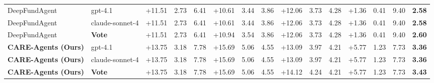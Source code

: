 \begin{table}[t]
{\begin{tabular}{llrrrrrrrrrrrrr}
DeepFundAgent & gpt-4.1 & +11.51 & 2.73 & 6.41 & +10.61 & 3.44 & 3.86 & +12.06 & 3.73 & 4.28 & +1.36 & 0.41 & 9.40 & \textbf{2.58} \\
DeepFundAgent & claude-sonnet-4 & +11.51 & 2.73 & 6.41 & +10.61 & 3.44 & 3.86 & +12.06 & 3.73 & 4.28 & +1.36 & 0.41 & 9.40 & \textbf{2.58} \\
DeepFundAgent & \textbf{Vote} & +11.51 & 2.73 & 6.41 & +10.94 & 3.54 & 3.86 & +12.06 & 3.73 & 4.28 & +1.36 & 0.41 & 9.40 & \textbf{2.60} \\
\textbf{CARE-Agents (Ours)} & gpt-4.1 & +13.75 & 3.18 & 7.78 & +15.69 & 5.06 & 4.55 & +13.09 & 3.97 & 4.21 & +5.77 & 1.23 & 7.73 & \textbf{3.36} \\
\textbf{CARE-Agents (Ours)} & claude-sonnet-4 & +13.75 & 3.18 & 7.78 & +15.69 & 5.06 & 4.55 & +13.09 & 3.97 & 4.21 & +5.77 & 1.23 & 7.73 & \textbf{3.36} \\
\textbf{CARE-Agents (Ours)} & \textbf{Vote} & +13.75 & 3.18 & 7.78 & +15.69 & 5.06 & 4.55 & +14.12 & 4.24 & 4.21 & +5.77 & 1.23 & 7.73 & \textbf{3.43} \\
\bottomrule
\end{tabular}%
}
\end{table}
